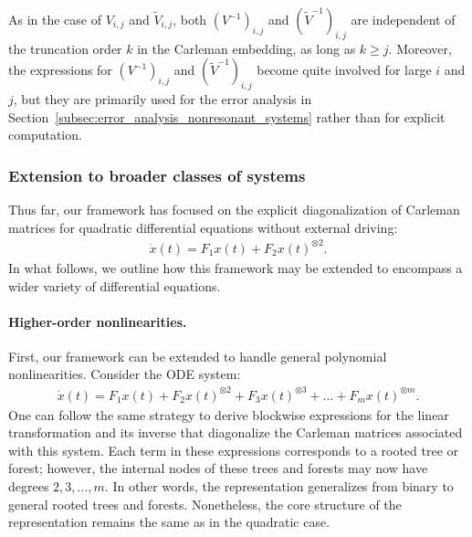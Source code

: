\documentclass[superscriptaddress,onecolumn,nofootinbib,longbibliography,a4paper,accepted=2026-09-29]{quantumarticle}
\theoremstyle{plain}
\theoremstyle{definition}
\numberwithin{thm}{section}
\numberwithin{assumption}{section}
\numberwithin{lemma}{section}
\numberwithin{prop}{section}
\numberwithin{cor}{section}
\numberwithin{definition}{section}
\numberwithin{rmk}{section}
\numberwithin{equation}{section}
\begin{document}
As in the case of $V_{i,j}$ and $\tilde{V}_{i,j}$, both $(V^{-1})_{i,j}$ and $(\tilde{V}^{-1})_{i,j}$ are independent of the truncation order $k$ in the Carleman embedding, as long as $k \ge j$. Moreover, the expressions for $(V^{-1})_{i,j}$ and $(\tilde{V}^{-1})_{i,j}$ become quite involved for large $i$ and $j$, but they are primarily used for the error analysis in Section~\ref{subsec:error_analysis_nonresonant_systems} rather than for explicit computation.

\subsubsection{Extension to broader classes of systems}
\label{subsec:carleman_matrix_diagonalization_extension}
Thus far, our framework has focused on the explicit diagonalization of Carleman matrices for quadratic differential equations without external driving:
\begin{align}
\dot{x}(t)=F_1 x(t) + F_2 x(t)^{\otimes 2}.
\end{align}
In what follows, we outline how this framework may be extended to encompass a wider variety of differential equations.

\paragraph{Higher-order nonlinearities.} First, our framework can be extended to handle general polynomial nonlinearities. Consider the ODE system:
\begin{align}
\dot{x}(t) = F_1 x(t) + F_2 x(t)^{\otimes 2} + F_3 x(t)^{\otimes 3} + \dots + F_m x(t)^{\otimes m}.
\end{align}
One can follow the same strategy to derive blockwise expressions for the  linear transformation and its inverse that diagonalize the Carleman matrices associated with this system. Each term in these expressions corresponds to a rooted  tree or forest; however, the internal nodes of these trees and forests may now have degrees $2, 3, \dots, m$. In other words, the representation generalizes from binary to general rooted trees and forests. Nonetheless, the core structure of the representation remains the same as in the quadratic case.
\end{document}
